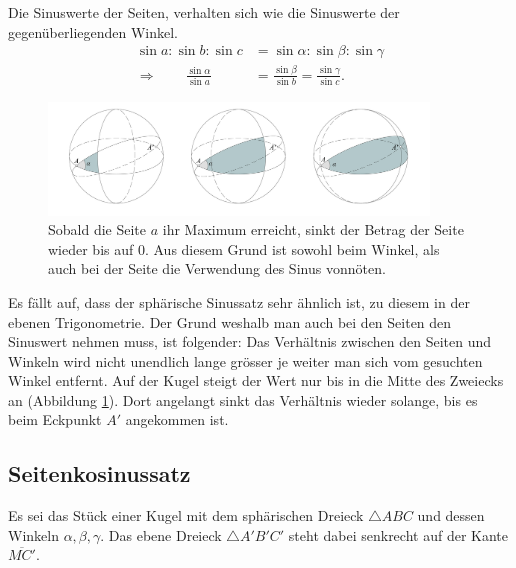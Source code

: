 \begin{refsection}
\begin{satz}
Die Sinuswerte der Seiten, verhalten sich wie die Sinuswerte der
gegenüberliegenden Winkel.
\begin{align*}
\sin a : \sin b : \sin c &= \sin \alpha : \sin \beta : \sin \gamma \\
\Rightarrow \quad \quad
\frac{\sin \alpha} {\sin a} &= \frac{\sin \beta} {\sin b} = \frac{\sin \gamma} {\sin c}.
\end{align*} 
\label{skript:kugel:satz:Sinussatz}
%
\end{satz}

\begin{figure}[htbp]
\centering
\includegraphics[width=0.9\textwidth]{kugel/SinussatzB.jpg}
\caption{Sobald die Seite $a$ ihr Maximum erreicht, sinkt der Betrag
der Seite wieder bis auf 0. Aus diesem Grund ist sowohl beim Winkel,
als auch bei der Seite die Verwendung des Sinus vonnöten.}
\label{Beweissinus}
\end{figure}

Es fällt auf, dass der sphärische Sinussatz sehr ähnlich ist, zu
diesem in der ebenen Trigonometrie.
Der Grund weshalb man auch bei den Seiten den Sinuswert nehmen muss,
ist folgender:
Das Verhältnis zwischen den Seiten und Winkeln wird nicht unendlich
lange grösser je weiter man sich vom gesuchten Winkel entfernt. Auf
der Kugel steigt der Wert nur bis in die Mitte des Zweiecks an
(Abbildung \ref{Beweissinus}). Dort angelangt sinkt das Verhältnis
wieder solange, bis es beim Eckpunkt $A'$ angekommen ist.


\subsection{Seitenkosinussatz}
Es sei das Stück einer Kugel mit dem sphärischen Dreieck $\triangle{ABC}$
und dessen Winkeln $\alpha, \beta, \gamma$. Das ebene Dreieck
$\triangle{A'B'C'}$ steht dabei senkrecht auf der Kante $\overline{MC'}$.


\end{refsection}
